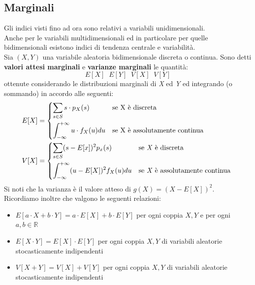 \subsection{Marginali}
Gli indici visti fino ad ora sono relativi a variabili unidimensionali.\\
Anche per le variabili multidimensionali ed in particolare per quelle bidimensionali esistono indici di tendenza centrale e variabilità.\\
Sia $(X,Y)$ una variabile aleatoria bidimensionale discreta o continua. Sono detti \textbf{valori attesi marginali} e \textbf{varianze marginali} le quantità:
\[ E[X] \;\; E[Y] \;\; V[X] \;\; V[Y] \]
ottenute considerando le distribuzioni marginali di \textit{X} ed \textit{Y} ed integrando (o sommando) in accordo alle seguenti:
\begin{align*}
E[X] &= 
\begin{dcases*}
\sum_{s \in S} s \cdot p_X(s) & \text{se X è discreta} \\
\int_{-\infty}^{+\infty} u \cdot f_X(u) du & \text{se X è assolutamente continua}
\end{dcases*} \\
V[X] &= 
\begin{dcases*}
\sum_{s \in S}  (s - E[x])^2 p_x(s) & \text{se \textit{X} è discreta}  \\
\int_{-\infty}^{+\infty} (u - E[X])^2  f_X(u)du & \text{se \textit{X} è assolutamente continua}
\end{dcases*}
\end{align*}
Si noti che la varianza è il valore atteso di $g(X) = (X - E[X])^2$.\\
Ricordiamo inoltre che valgono le seguenti relazioni:
\begin{itemize}
	\item $E[a \cdot X + b \cdot Y] = a \cdot E[X] + b \cdot E[Y]$ per ogni coppia $X, Y$ e per ogni $a, b \in \mathbb{R}$
	\item $E[X \cdot Y] = E[X] \cdot E[Y]$ per ogni coppia $X, Y$ di variabili aleatorie stocasticamente indipendenti
	\item $V[X + Y] = V[X] + V[Y]$ per ogni coppia $X, Y$ di variabili aleatorie stocasticamente indipendenti
\end{itemize}

